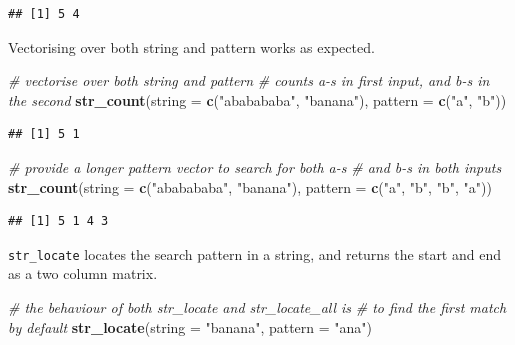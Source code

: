 \documentclass[]{book}
\newenvironment{Shaded}{}{}
\newcommand{\CommentTok}[1]{\textcolor[rgb]{0.38,0.63,0.69}{\textit{#1}}}
\newcommand{\DataTypeTok}[1]{\textcolor[rgb]{0.56,0.13,0.00}{#1}}
\newcommand{\KeywordTok}[1]{\textcolor[rgb]{0.00,0.44,0.13}{\textbf{#1}}}
\newcommand{\NormalTok}[1]{#1}
\newcommand{\StringTok}[1]{\textcolor[rgb]{0.25,0.44,0.63}{#1}}
\begin{document}
\begin{verbatim}
## [1] 5 4
\end{verbatim}

Vectorising over both string and pattern works as expected.

\begin{Shaded}
\begin{Highlighting}[]
\CommentTok{# vectorise over both string and pattern}
\CommentTok{# counts a-s in first input, and b-s in the second}
\KeywordTok{str_count}\NormalTok{(}\DataTypeTok{string =} \KeywordTok{c}\NormalTok{(}\StringTok{"ababababa"}\NormalTok{, }\StringTok{"banana"}\NormalTok{),}
          \DataTypeTok{pattern =} \KeywordTok{c}\NormalTok{(}\StringTok{"a"}\NormalTok{, }\StringTok{"b"}\NormalTok{))}
\end{Highlighting}
\end{Shaded}

\begin{verbatim}
## [1] 5 1
\end{verbatim}

\begin{Shaded}
\begin{Highlighting}[]
\CommentTok{# provide a longer pattern vector to search for both a-s}
\CommentTok{# and b-s in both inputs}
\KeywordTok{str_count}\NormalTok{(}\DataTypeTok{string =} \KeywordTok{c}\NormalTok{(}\StringTok{"ababababa"}\NormalTok{, }\StringTok{"banana"}\NormalTok{),}
          \DataTypeTok{pattern =} \KeywordTok{c}\NormalTok{(}\StringTok{"a"}\NormalTok{, }\StringTok{"b"}\NormalTok{,}
                      \StringTok{"b"}\NormalTok{, }\StringTok{"a"}\NormalTok{))}
\end{Highlighting}
\end{Shaded}

\begin{verbatim}
## [1] 5 1 4 3
\end{verbatim}

\texttt{str\_locate} locates the search pattern in a string, and returns the start and end as a two column matrix.

\begin{Shaded}
\begin{Highlighting}[]
\CommentTok{# the behaviour of both str_locate and str_locate_all is}
\CommentTok{# to find the first match by default}
\KeywordTok{str_locate}\NormalTok{(}\DataTypeTok{string =} \StringTok{"banana"}\NormalTok{, }\DataTypeTok{pattern =} \StringTok{"ana"}\NormalTok{)}
\end{Highlighting}
\end{Shaded}
\end{document}
